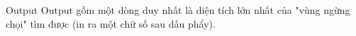 Output
Output gồm một dòng duy nhất là diện tích lớn nhất của "vùng ngừng chọi" tìm được (in ra một chữ số sau dấu phẩy).